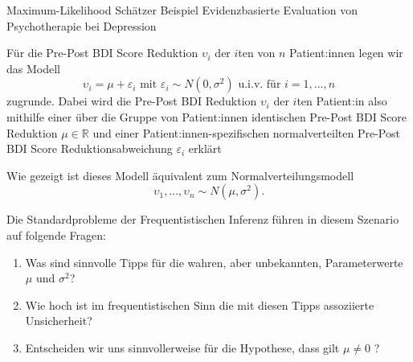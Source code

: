 \documentclass[
  8pt,
  ignorenonframetext,
]{beamer}
\providecommand{\tightlist}{%
  \setlength{\itemsep}{0pt}\setlength{\parskip}{0pt}}
\newcommand{\ups} {\upsilon}
\begin{document}
\begin{frame}[t]{Maximum-Likelihood Schätzer}
\protect\hypertarget{maximum-likelihood-schuxe4tzer-13}{}
Beispiel \textbar{} Evidenzbasierte Evaluation von Psychotherapie bei
Depression \vspace{2mm}

\small

Für die Pre-Post BDI Score Reduktion \(\ups_i\) der \(i\)ten von \(n\)
Patient:innen legen wir das Modell \begin{equation}
\ups_{i} = \mu + \varepsilon_{i} \mbox{ mit } \varepsilon_{i} \sim N(0,\sigma^2) \mbox{ u.i.v. für } i = 1,...,n
\end{equation} zugrunde. Dabei wird die Pre-Post BDI Reduktion
\(\ups_i\) der \(i\)ten Patient:in also mithilfe einer über die Gruppe
von Patient:innen identischen Pre-Post BDI Score Reduktion
\(\mu \in \mathbb{R}\) und einer Patient:innen-spezifischen
normalverteilten Pre-Post BDI Score Reduktionsabweichung
\(\varepsilon_{i}\) erklärt

Wie gezeigt ist dieses Modell äquivalent zum Normalverteilungsmodell
\begin{equation}
\ups_1,...,\ups_n \sim N(\mu,\sigma^2).
\end{equation}

Die Standardprobleme der Frequentistischen Inferenz führen in diesem
Szenario auf folgende Fragen:

\begin{enumerate}
[(1)]
\tightlist
\item
  Was sind sinnvolle Tipps für die wahren, aber unbekannten,
  Parameterwerte \(\mu\) und \(\sigma^2\)?
\item
  Wie hoch ist im frequentistischen Sinn die mit diesen Tipps
  assoziierte Unsicherheit?
\item
  Entscheiden wir uns sinnvollerweise für die Hypothese, dass gilt
  \(\mu\neq 0\) ?
\end{enumerate}
\end{frame}
\end{document}
